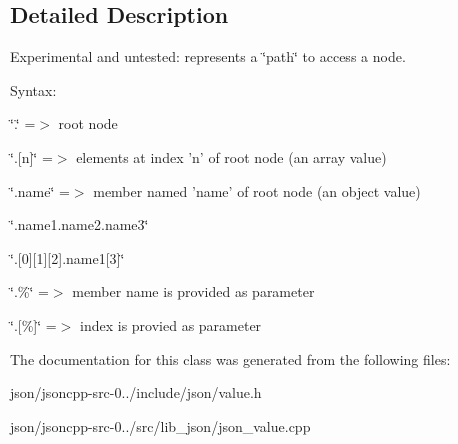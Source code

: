 \subsection{Detailed Description}
Experimental and untested\+: represents a \char`\"{}path\char`\"{} to access a node. 

Syntax\+:
\begin{DoxyItemize}
\item \char`\"{}.\char`\"{} =$>$ root node
\item \char`\"{}.\mbox{[}n\mbox{]}\char`\"{} =$>$ elements at index 'n' of root node (an array value)
\item \char`\"{}.\+name\char`\"{} =$>$ member named 'name' of root node (an object value)
\item \char`\"{}.\+name1.\+name2.\+name3\char`\"{}
\item \char`\"{}.\mbox{[}0\mbox{]}\mbox{[}1\mbox{]}\mbox{[}2\mbox{]}.\+name1\mbox{[}3\mbox{]}\char`\"{}
\item \char`\"{}.\%\char`\"{} =$>$ member name is provided as parameter
\item \char`\"{}.\mbox{[}\%\mbox{]}\char`\"{} =$>$ index is provied as parameter 
\end{DoxyItemize}

The documentation for this class was generated from the following files\+:\begin{DoxyCompactItemize}
\item 
json/jsoncpp-\/src-\/0../include/json/value.\+h\item 
json/jsoncpp-\/src-\/0../src/lib\+\_\+json/json\+\_\+value.\+cpp\end{DoxyCompactItemize}
